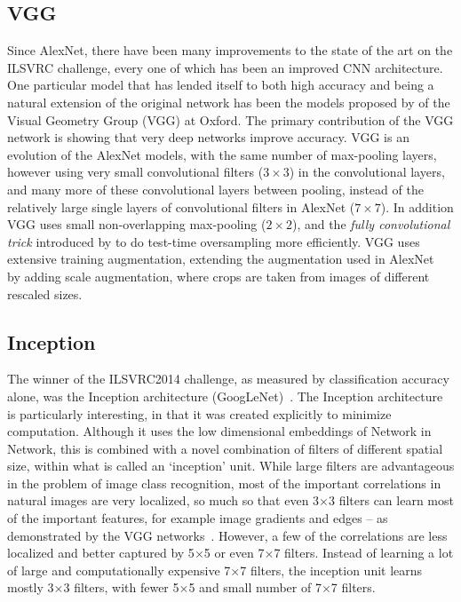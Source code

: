 \documentclass[thesis]{subfiles}
\begin{document}
\subsection{VGG}
Since AlexNet, there have been many improvements to the state of the art on the ILSVRC challenge, every one of which has been an improved CNN architecture. One particular model that has lended itself to both high accuracy and being a natural extension of the original network has been the models proposed by \citet{Simonyan2014verydeep} of the Visual Geometry Group (VGG) at Oxford. The primary contribution of the VGG network is showing that very deep networks improve accuracy. VGG is an evolution of the AlexNet models, with the same number of max-pooling layers, however using very small convolutional filters ($3 \times 3$) in the convolutional layers, and many more of these convolutional layers between pooling, instead of the relatively large single layers of convolutional filters in AlexNet ($7\times 7$). In addition VGG uses small non-overlapping max-pooling ($2\times 2$), and the \emph{fully convolutional trick} introduced by \citet{Sermanet2013overfeat} to do test-time oversampling more efficiently. VGG uses extensive training augmentation, extending the augmentation used in AlexNet~\citep{Krizhevsky2012} by adding scale augmentation, where crops are taken from images of different rescaled sizes. 


\subsection{Inception}
The winner of the ILSVRC2014 challenge, as measured by classification accuracy alone, was the Inception architecture (GoogLeNet)~\citep{Szegedy2014going}. The Inception architecture is particularly interesting, in that it was created explicitly to minimize computation. Although it uses the low dimensional embeddings of Network in Network, this is combined with a novel combination of filters of different spatial size, within what is called an `inception' unit. While large filters are advantageous in the problem of image class recognition, most of the important correlations in natural images are very localized, so much so that even 3$\times$3 filters can learn most of the important features, for example image gradients and edges -- as demonstrated by the VGG networks~\citep{Simonyan2014verydeep}. However, a few of the correlations are less localized and better captured by 5$\times$5 or even 7$\times$7 filters. Instead of learning a lot of large and computationally expensive 7$\times$7 filters, the inception unit learns mostly 3$\times$3 filters, with fewer 5$\times$5 and small number of 7$\times$7 filters. 
\end{document}
